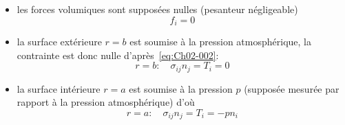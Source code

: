 \begin{itemize}
    \item les forces volumiques sont supposées nulles (pesanteur négligeable)
        \begin{equation}
            f_i = 0
            \label{eq:Ch04-001}
        \end{equation}
    \item la surface extérieure $r=b$ est soumise à la pression atmosphérique, la contrainte est donc nulle d'après~\eqref{eq:Ch02-002}:
        \begin{equation}
            r=b:\quad \sigma_{ij} n_j = T_i = 0
            \label{eq:Ch04-002}
        \end{equation}
    \item la surface intérieure $r=a$ est soumise à la pression $p$ (supposée mesurée par rapport à la pression atmosphérique) d'où
        \begin{equation}
            r=a:\quad \sigma_{ij} n_j = T_i = -p n_i
            \label{eq:Ch04-003}
        \end{equation}
\end{itemize}
